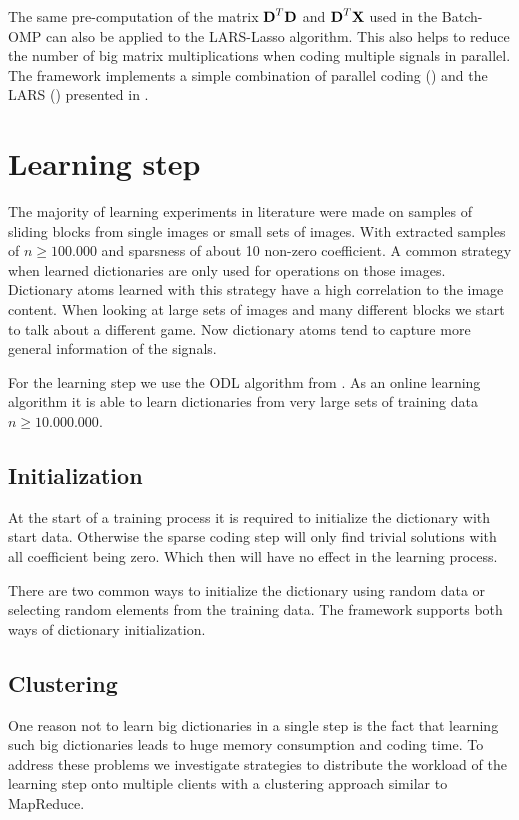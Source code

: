 The same pre-computation of the matrix $\boldsymbol{\mathrm{D}}^T\boldsymbol{\mathrm{D}}$ and
$\boldsymbol{\mathrm{D}}^T\boldsymbol{\mathrm{X}}$ used in the Batch-OMP can also be applied to the LARS-Lasso
algorithm. This also helps to reduce the number of big matrix multiplications
when coding multiple signals in parallel. The framework implements a simple
combination of parallel coding () and the
LARS () presented in .

\section{Learning step}
The majority of learning experiments in literature were made on
samples of sliding blocks from single images or small sets of images.
With extracted samples of $n \ge 100.000$ and sparsness of about 10 non-zero
coefficient. A common strategy when learned dictionaries are only used for
operations on those images. Dictionary atoms learned with this strategy 
have a high correlation to the image content. 
When looking at large sets of images and many different blocks we start to talk
about a different game. Now dictionary atoms tend to capture more
general information of the signals.

For the learning step we use the ODL algorithm from . As
an online learning algorithm it is able to learn dictionaries from very large
sets of training data $n\ge 10.000.000$.


\subsection{Initialization}
At the start of a training process it is required to initialize the
dictionary with start data. Otherwise the sparse coding step will only find
trivial solutions with all coefficient being zero. Which then will have no
effect in the learning process.

There are two common ways to initialize the dictionary using random data or
selecting random elements from the training data. The framework supports 
both ways of dictionary initialization. 


\subsection{Clustering}
\label{sec:clustering}
One reason not to learn big dictionaries in a single step is the fact that
learning such big dictionaries leads to huge memory consumption and coding time.
To address these problems we investigate strategies to distribute the workload
of the learning step onto multiple clients with a clustering approach similar to
MapReduce. 

